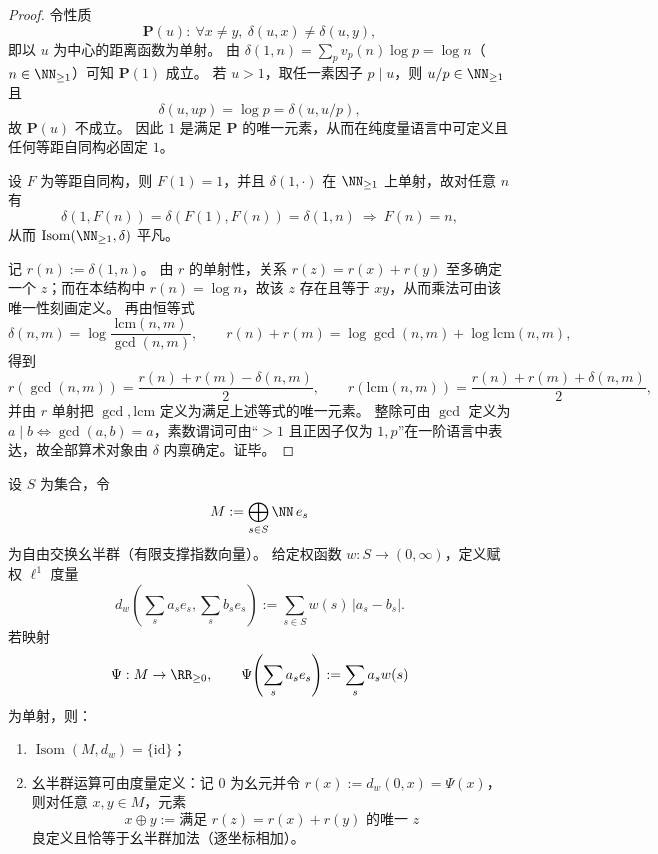 \begin{proof}
令性质
\[
\mathbf P(u):\ \forall x\neq y,\ \delta(u,x)\neq \delta(u,y),
\]
即以 \(u\) 为中心的距离函数为单射。
由 \(\delta(1,n)=\sum_p v_p(n)\log p=\log n\)（\(n\in\NN_{\ge 1}\)）可知 \(\mathbf P(1)\) 成立。
若 \(u>1\)，取任一素因子 \(p\mid u\)，则 \(u/p\in\NN_{\ge 1}\) 且
\[
\delta(u,up)=\log p=\delta(u,u/p),
\]
故 \(\mathbf P(u)\) 不成立。
因此 \(1\) 是满足 \(\mathbf P\) 的唯一元素，从而在纯度量语言中可定义且任何等距自同构必固定 \(1\)。
\par
设 \(F\) 为等距自同构，则 \(F(1)=1\)，并且 \(\delta(1,\cdot)\) 在 \(\NN_{\ge 1}\) 上单射，故对任意 \(n\) 有
\[
\delta(1,F(n))=\delta(F(1),F(n))=\delta(1,n)\ \Longrightarrow\ F(n)=n,
\]
从而 \(\operatorname{Isom}(\NN_{\ge 1},\delta)\) 平凡。
\par
记 \(r(n):=\delta(1,n)\)。
由 \(r\) 的单射性，关系 \(r(z)=r(x)+r(y)\) 至多确定一个 \(z\)；而在本结构中 \(r(n)=\log n\)，故该 \(z\) 存在且等于 \(xy\)，从而乘法可由该唯一性刻画定义。
再由恒等式
\[
\delta(n,m)=\log\frac{\mathrm{lcm}(n,m)}{\gcd(n,m)},\qquad
r(n)+r(m)=\log\gcd(n,m)+\log\mathrm{lcm}(n,m),
\]
得到
\[
r(\gcd(n,m))=\frac{r(n)+r(m)-\delta(n,m)}{2},\qquad
r(\mathrm{lcm}(n,m))=\frac{r(n)+r(m)+\delta(n,m)}{2},
\]
并由 \(r\) 单射把 \(\gcd,\mathrm{lcm}\) 定义为满足上述等式的唯一元素。
整除可由 \(\gcd\) 定义为 \(a\mid b\iff \gcd(a,b)=a\)，素数谓词可由“\(>1\) 且正因子仅为 \(1,p\)”在一阶语言中表达，故全部算术对象由 \(\delta\) 内禀确定。证毕。
\end{proof}

\begin{theorem}[赋权自由交换幺半群的度量决定代数]\label{thm:conclusion-weighted-free-cmon-metric-rigidity}
设 \(S\) 为集合，令
\[
M:=\bigoplus_{s\in S}\NN\,e_s
\]
为自由交换幺半群（有限支撑指数向量）。
给定权函数 \(w:S\to(0,\infty)\)，定义赋权 \(\ell^1\) 度量
\[
d_w\!\left(\sum_s a_s e_s,\sum_s b_s e_s\right):=\sum_{s\in S} w(s)\,|a_s-b_s|.
\]
若映射
\[
\Psi:M\to\RR_{\ge 0},\qquad
\Psi\!\left(\sum_s a_s e_s\right):=\sum_s a_s w(s)
\]
为单射，则：
\begin{enumerate}
  \item \(\operatorname{Isom}(M,d_w)=\{\mathrm{id}\}\)；
  \item 幺半群运算可由度量定义：记 \(0\) 为幺元并令 \(r(x):=d_w(0,x)=\Psi(x)\)，则对任意 \(x,y\in M\)，元素
  \[
  x\oplus y:=\text{满足 }r(z)=r(x)+r(y)\text{ 的唯一 }z
  \]
  良定义且恰等于幺半群加法（逐坐标相加）。
\end{enumerate}
\end{theorem}

